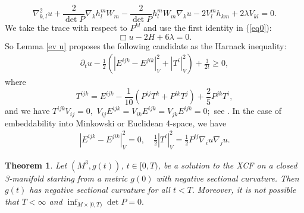 \documentclass{amsart}
\newtheorem{theorem}{Theorem}
\theoremstyle{definition}
\theoremstyle{remark}
\numberwithin{equation}{section}
\begin{document}
\begin{equation*}
\nabla^2_{k,l}u+\frac{2}{\det P}\nabla_kh_l^mW_m-\frac{2}{\det P}h_l^mW_m\nabla_ku-2V_l^mh_{km}+2\lambda V_{kl}=0.
\end{equation*}
We take the trace with respect to $P^{kl}$ and use the first identity in (\ref{eq0}):
\begin{equation}\label{eq:5}
\Box u-2H+6\lambda=0.
\end{equation}
So Lemma \ref{ev u} proposes the following candidate as the  Harnack inequality:
 \begin{align}\label{harnack est}
\partial_tu-\frac{1}{2}\left(\left|E^{ijk}-E^{jik}\right|^2_V+\left|T^i\right|_V^2\right)+\frac{3}{2t}\geq 0,
\end{align}
 where
 \[T^{ijk}=E^{ijk}-\frac{1}{10}\left(P^{ij}T^k+P^{ik}T^j\right)+\frac{2}{5}P^{jk}T^i,\]
 and we have $T^{ijk}V_{ij}=0,$ $V_{ij}E^{ijk}=V_{ik}E^{ijk}=V_{jk}E^{ijk}=0;$ see \cite[Prop. 9]{Chowcross2002}. In the case of embeddability into Minkowski or Euclidean 4-space, we have
 \begin{align*}
\left|E^{ijk}-E^{jik}\right|^2_V=0,\quad\frac{1}{2}\left|T^i\right|_V^2=\frac{1}{2}P^{ij}\nabla_i u\nabla_ju.
 \end{align*}
\begin{theorem}
Let $(M^3,g(t))$, $t\in [0,T)$, be a solution to the XCF on a closed 3-manifold starting from a metric $g(0)$ with negative sectional curvature. Then $g(t)$ has negative sectional curvature for all $t<T.$
Moreover, it is not possible that $T<\infty$ and $\inf_{M\times [0,T)}\det P=0.$
\end{theorem}
\end{document}
